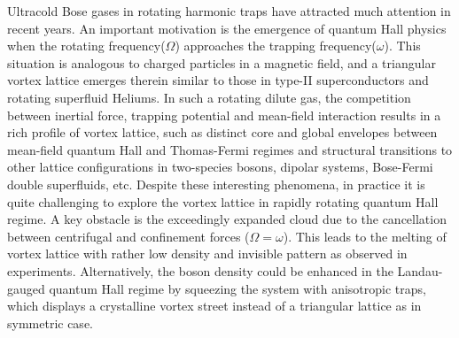 \documentclass[reprint,aps,prl,twocolumn,superscriptaddress]{revtex4-1}
\begin{document}
Ultracold Bose gases in rotating harmonic traps have attracted much attention in recent years\cite{review1,review2}. An important motivation is the emergence of quantum Hall physics when the rotating frequency($\Omega$) approaches the trapping frequency($\omega$)\cite{JasonHo, Cooper}. This situation is analogous to charged particles in a magnetic field, and a triangular vortex lattice emerges therein similar to  those  in type-II superconductors\cite{Abrikosov1957} and rotating superfluid Heliums\cite{Tkachenko1966}. In such a rotating dilute gas, the competition between inertial force, trapping potential and mean-field interaction results in a rich profile of vortex lattice, such as distinct core and global envelopes between mean-field quantum Hall and Thomas-Fermi regimes\cite{Fischer2003,Baym2004} and structural transitions to other lattice configurations in two-species bosons\cite{Mueller_Ho2002,Ueda2003,Cornell2}, dipolar systems\cite{Cooper2,HuiZhai1,Kumar2017}, Bose-Fermi double superfluids\cite{HuiZhai2}, etc.  %
Despite these interesting phenomena, in practice it is quite  challenging  to explore the vortex lattice in rapidly rotating quantum Hall regime. A key obstacle is the exceedingly expanded cloud due to the cancellation between centrifugal and confinement forces ($\Omega=\omega$). This leads to the melting of vortex lattice with rather low density  and invisible pattern as observed in experiments\cite{QH_expt1, QH_expt2}. Alternatively, the boson density could be enhanced in the Landau-gauged quantum Hall regime by %
squeezing the system with anisotropic traps\cite{MIT_expt1, MIT_expt2}, which  displays a crystalline vortex street\cite{Gora} instead of a triangular lattice as in symmetric case. 
 
\end{document}
